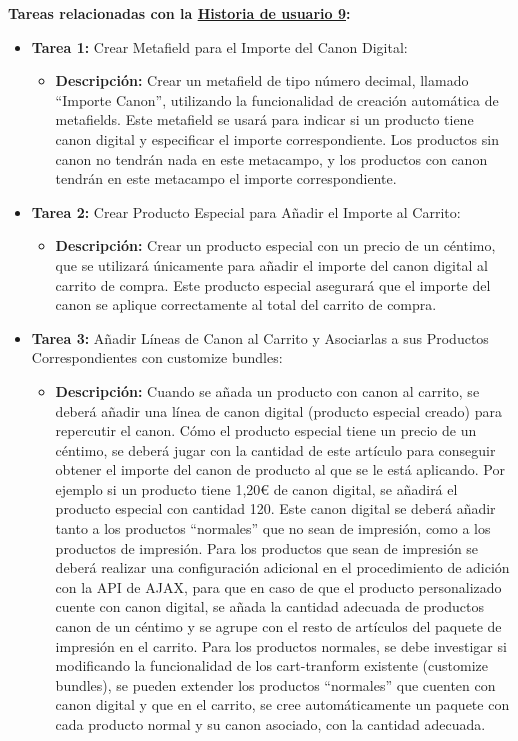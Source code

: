 \documentclass[12pt]{article}
\begin{document}
\textbf{Tareas relacionadas con la \hyperref[sec:historia9]{Historia de usuario 9}:}
\begin{itemize}
    \item \textbf{Tarea 1:} Crear Metafield para el Importe del Canon Digital:
          \begin{itemize}[label=--]
              \item \textbf{Descripción:} Crear un metafield de tipo número decimal, llamado ``Importe Canon'', utilizando la funcionalidad de creación automática de metafields. Este metafield se usará para indicar si un producto tiene canon digital y especificar el importe correspondiente. Los productos sin canon no tendrán nada en este metacampo, y los productos con canon tendrán en este metacampo el importe correspondiente.
          \end{itemize}
    \item \textbf{Tarea 2:} Crear Producto Especial para Añadir el Importe al Carrito:
          \begin{itemize}[label=--]
              \item \textbf{Descripción:} Crear un producto especial con un precio de un céntimo, que se utilizará únicamente para añadir el importe del canon digital al carrito de compra. Este producto especial asegurará que el importe del canon se aplique correctamente al total del carrito de compra.
          \end{itemize}
    \item \textbf{Tarea 3:} Añadir Líneas de Canon al Carrito y Asociarlas a sus Productos Correspondientes con customize bundles:
          \begin{itemize}[label=--]
              \item \textbf{Descripción:} Cuando se añada un producto con canon al carrito, se deberá añadir una línea de canon digital (producto especial creado) para repercutir el canon.
              Cómo el producto especial tiene un precio de un céntimo, se deberá jugar con la cantidad de este artículo para conseguir obtener el importe del canon de producto al que se le está aplicando. Por ejemplo
              si un producto tiene 1,20€ de canon digital, se añadirá el producto especial con cantidad 120.
              Este canon digital se deberá añadir tanto a los productos ``normales'' que no sean de impresión, como a los productos de impresión.
              Para los productos que sean de impresión se deberá realizar una configuración adicional en el procedimiento de adición con la API de AJAX, para que en caso de que el producto personalizado cuente con canon digital, se añada la cantidad adecuada de productos canon de un céntimo y se agrupe con el resto de artículos del paquete de impresión en el carrito.
              Para los productos normales, se debe investigar si modificando la funcionalidad de los cart-tranform existente (customize bundles), se pueden extender los productos ``normales'' que cuenten con canon digital y que en el carrito, se cree automáticamente un paquete con cada producto normal y su canon asociado, con la cantidad adecuada.
          \end{itemize}
\end{itemize}
\end{document}
